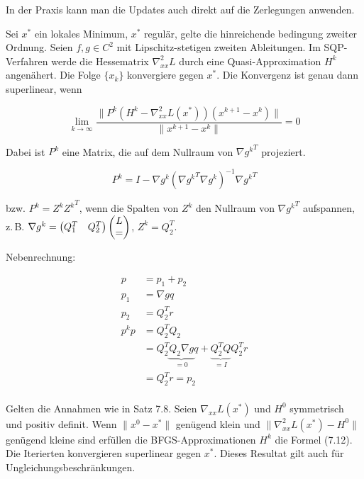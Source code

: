 In der Praxis kann man die Updates auch direkt auf die Zerlegungen anwenden.



Sei $x^*$ ein lokales Minimum, $x^*$ regulär, gelte die hinreichende bedingung zweiter Ordnung. Seien $f,g \in C^2$ mit Lipschitz-stetigen zweiten Ableitungen. Im SQP-Verfahren werde die Hessematrix $\nabla_{xx}^2 L$ durch eine Quasi-Approximation $H^k$ angenähert. Die Folge $\{x_k\}$ konvergiere gegen $x^*$. Die Konvergenz ist genau dann superlinear, wenn

\[ \lim_{k \to \infty} \frac{\|P^k (H^k - \nabla_{xx}^2 L(x^*)) (x^{k+1} - x^k)\|}{\|x^{k+1} - x^k\|} = 0 \]

Dabei ist $P^k$ eine Matrix, die auf dem Nullraum von $\nabla {g^k}^T$ projeziert.


\[ P^k = I - \nabla g^k (\nabla {g^k}^T \nabla g^k)^{-1} \nabla {g^k}^T \]

bzw. $P^k = Z^k {Z^k}^T$, wenn die Spalten von $Z^k$ den Nullraum von ${\nabla g^k}^T$ aufspannen, z.\,B. $\nabla g^k = \begin{pmatrix} Q_1^T & Q_2^T \end{pmatrix} \begin{pmatrix} L \\ = \end{pmatrix}$, $Z^k = Q_2^T$.

Nebenrechnung:

\begin{align*}
p &= p_1 + p_2 \\
p_1 &= \nabla g q \\
p_2 &= Q_2^T r \\
p^k p &= Q_2^T Q_2  \\
&= Q_2^T \underbrace{Q_2 \nabla g}_{=0} q + \underbrace{Q_2^T Q}_{=I} Q_2^T r \\
&= Q_2^T r = p_2 \\
\end{align*}



Gelten die Annahmen wie in Satz 7.8. Seien $\nabla_{xx} L(x^*)$ und $H^0$ symmetrisch und positiv definit. Wenn $\|x^0 - x^*\|$ genügend klein und $\|\nabla_{xx}^2 L(x^*) - H^0\|$ genügend kleine sind erfüllen die BFGS-Approximationen $H^k$ die Formel (7.12). Die Iterierten konvergieren superlinear gegen $x^*$. Dieses Resultat gilt auch für Ungleichungsbeschränkungen.

